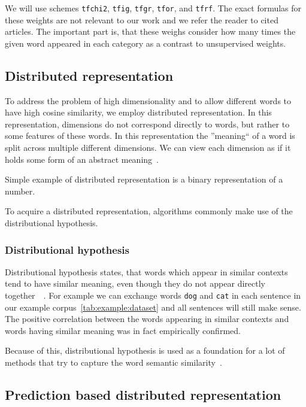     We will use schemes \texttt{tfchi2}, \texttt{tfig}, \texttt{tfgr}, \texttt{tfor}, and \texttt{tfrf}.
    The exact formulas for these weights are not relevant to our work and we refer the reader to cited articles.
    The important part is, that these weighs consider how many times the given word appeared in each category as a contrast to unsupervised weights. 
    
    
    \subsection{Distributed representation}
    
    To address the problem of high dimensionality and to allow different words to have high cosine similarity, we employ distributed representation.
    In this representation, dimensions do not correspond directly to words, but rather to some features of these words.
    In this representation the ''meaning`` of a word is split across multiple different dimensions.
    We can view each dimension as if it holds some form of an abstract meaning~\cite{le2014distributed}. 
    
    Simple example of distributed representation is a binary representation of a number.
    
    To acquire a distributed representation, algorithms commonly make use of the distributional hypothesis.

    \subsubsection{Distributional hypothesis}
    
    Distributional hypothesis states, that words which appear in similar contexts tend to have similar meaning,
    even though they do not appear directly together~\cite{harris1954distributional}~\cite{Rubenstein:1965:CCS:365628.365657}. %
    For example we can exchange words \texttt{dog} and \texttt{cat} in each sentence in our example corpus~\ref{tab:example:dataset}
    and all sentences will still make sense. 
    The positive correlation between the words appearing in similar contexts and words having similar meaning was in fact empirically confirmed.
    
    Because of this, distributional hypothesis is used as a foundation for a lot of methods that try to capture the word semantic similarity~\cite{rubenstein1965contextual}. 

    \subsection{Prediction based distributed representation}
    
